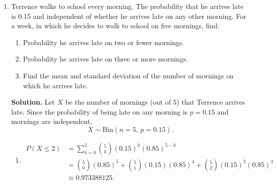 \documentclass[12pt]{scrartcl}
\begin{document}
\begin{enumerate}[label=\textbf{\arabic*.}]
\begin{enumerate}[label=(\alph*)]
\medskip

\textbf{Standard deviation.}
First compute
\begin{align*}
E(X^2)
&=\sum_x x^2P(X=x)\\
&=\frac{0^2(275)+1^2(111)+2^2(33)+3^2(12)+4^2(13)+5^2(16)}{460}\\
&=\frac{959}{460}.
\end{align*}
Then
\begin{align*}
\mathrm{Var}(X)
&=E(X^2)-\big(E(X)\big)^2\\
&=\frac{959}{460}-(0.75)^2\\
&\approx 1.5223,
\end{align*}
so the standard deviation is
\[
\sigma=\sqrt{\mathrm{Var}(X)}\approx \sqrt{1.5223}\approx 1.234.
\]

\item The expected value is
\[
E(X)=0.75,
\]
i.e.\ the expected number of late arrivals is $0.75$.
\end{enumerate}


\newpage
\item Terrence walks to school every morning. The probability that he arrives late is 0.15 and independent of whether he arrives late on any other morning.
For a week, in which he decides to walk to school on five mornings, find:

\begin{enumerate}[label=(\alph*)]
\item Probability he arrives late on two or fewer mornings.
\item Probability he arrives late on three or more mornings.
\item Find the mean and standard deviation of the number of mornings on which he arrives late.
\end{enumerate}

\medskip

\textbf{Solution.}
Let $X$ be the number of mornings (out of 5) that Terrence arrives late.
Since the probability of being late on any morning is $p=0.15$ and mornings are independent,
\[
X \sim \mathrm{Bin}(n=5,\,p=0.15).
\]

\begin{enumerate}[label=(\alph*)]
\item
\begin{align*}
P(X\le 2)
&=\sum_{k=0}^{2}\binom{5}{k}(0.15)^k(0.85)^{5-k}\\
&=\binom{5}{0}(0.85)^5+\binom{5}{1}(0.15)(0.85)^4+\binom{5}{2}(0.15)^2(0.85)^3\\
&\approx 0.973388125.
\end{align*}


\end{enumerate}
\end{enumerate}
\end{document}
